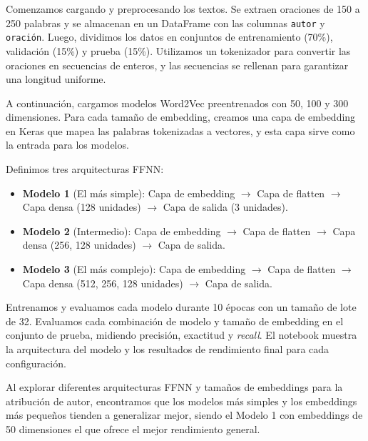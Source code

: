 \documentclass[11pt,english]{article}
\theoremstyle{plain}
\begin{document}
Comenzamos cargando y preprocesando los textos. Se extraen oraciones de 150 a 250 palabras y se almacenan en un DataFrame con las columnas \texttt{autor} y \texttt{oración}. Luego, dividimos los datos en conjuntos de entrenamiento (70\%), validación (15\%) y prueba (15\%). Utilizamos un tokenizador para convertir las oraciones en secuencias de enteros, y las secuencias se rellenan para garantizar una longitud uniforme.

A continuación, cargamos modelos Word2Vec preentrenados con 50, 100 y 300 dimensiones. Para cada tamaño de embedding, creamos una capa de embedding en Keras que mapea las palabras tokenizadas a vectores, y esta capa sirve como la entrada para los modelos.

Definimos tres arquitecturas FFNN:
\begin{itemize}
    \item \textbf{Modelo 1} (El más simple): Capa de embedding $\rightarrow$ Capa de flatten $\rightarrow$ Capa densa (128 unidades) $\rightarrow$ Capa de salida (3 unidades).
    \item \textbf{Modelo 2} (Intermedio): Capa de embedding $\rightarrow$ Capa de flatten $\rightarrow$ Capa densa (256, 128 unidades) $\rightarrow$ Capa de salida.
    \item \textbf{Modelo 3} (El más complejo): Capa de embedding $\rightarrow$ Capa de flatten $\rightarrow$ Capa densa (512, 256, 128 unidades) $\rightarrow$ Capa de salida.
\end{itemize}

Entrenamos y evaluamos cada modelo durante 10 épocas con un tamaño de lote de 32. Evaluamos cada combinación de modelo y tamaño de embedding en el conjunto de prueba, midiendo precisión, exactitud y \textit{recall}. El notebook muestra la arquitectura del modelo y los resultados de rendimiento final para cada configuración.

Al explorar diferentes arquitecturas FFNN y tamaños de embeddings para la atribución de autor, encontramos que los modelos más simples y los embeddings más pequeños tienden a generalizar mejor, siendo el Modelo 1 con embeddings de 50 dimensiones el que ofrece el mejor rendimiento general.
\end{document}
